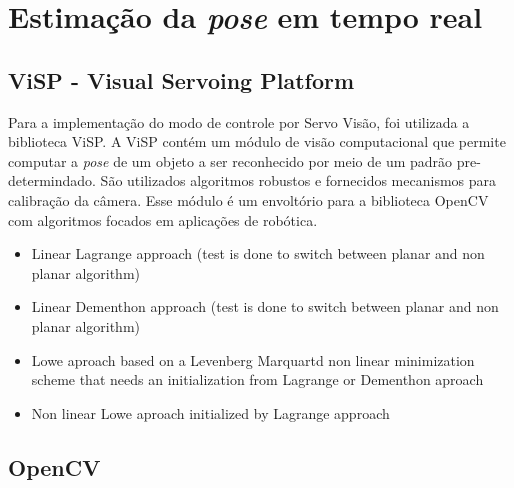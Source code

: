 \chapter{Estimação da \textit{pose} em tempo real} 
 
\section{ViSP - Visual Servoing Platform}

Para a implementação do modo de controle por Servo Visão, foi utilizada a biblioteca ViSP. A ViSP contém um módulo de visão computacional que permite computar a \textit{pose} de um objeto a ser reconhecido por meio de um padrão pre-determindado. São utilizados algoritmos robustos e fornecidos mecanismos para calibração da câmera. Esse módulo é um envoltório para a biblioteca OpenCV com algoritmos focados em aplicações de robótica.

\begin{itemize}
\item Linear Lagrange approach (test is done to switch between planar and non planar algorithm)
\item Linear Dementhon approach (test is done to switch between planar and non planar algorithm)
\item Lowe aproach based on a Levenberg Marquartd non linear minimization scheme that needs an initialization from Lagrange or Dementhon aproach
\item  Non linear Lowe aproach initialized by Lagrange approach
\end{itemize}

\section{OpenCV}
